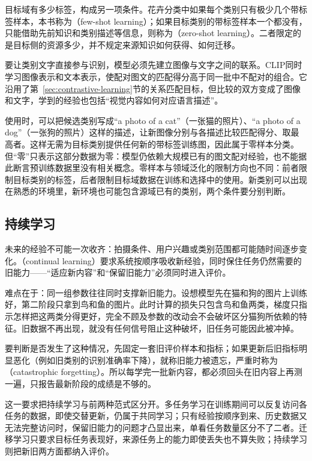 目标域有多少标签，构成另一项条件。花卉分类中如果每个类别只有极少几个带标签样本，本书称为（few-shot learning）；如果目标类别的带标签样本一个都没有，只能借助先前知识和类别描述等信息，则称为（zero-shot learning）。二者限定的是目标侧的资源多少，并不规定来源知识如何获得、如何迁移。

要让类别文字直接参与识别，模型必须先建立图像与文字之间的联系。CLIP同时学习图像表示和文本表示，使配对图文的匹配得分高于同一批中不配对的组合。它沿用了第~\ref{sec:contrastive-learning}节的关系匹配目标，但比较的双方变成了图像和文字，学到的经验也包括“视觉内容如何对应语言描述”。

使用时，可以把候选类别写成“a photo of a cat”（一张猫的照片）、“a photo of a dog”（一张狗的照片）这样的描述，让新图像分别与各描述比较匹配得分、取最高者。这样无需为目标类别提供任何新的带标签训练图，因此属于零样本分类。但“零”只表示这部分数据为零：模型仍依赖大规模已有的图文配对经验，也不能据此断言预训练数据里没有相关概念。零样本与领域泛化的限制方向也不同：前者限制目标类别的标签，后者限制目标域数据在训练和选择中的使用。新类别可以出现在熟悉的环境里，新环境也可能包含源域已有的类别，两个条件要分别判断。

\subsection{持续学习}
\label{sec:continual-learning}

未来的经验不可能一次收齐：拍摄条件、用户兴趣或类别范围都可能随时间逐步变化。（continual learning）要求系统按顺序吸收新经验，同时保住任务仍然需要的旧能力——“适应新内容”和“保留旧能力”必须同时进入评价。

难点在于：同一组参数往往同时支撑新旧能力。设想模型先在猫和狗的图片上训练好，第二阶段只拿到鸟和鱼的图片。此时计算的损失只包含鸟和鱼两类，梯度只指示怎样把这两类分得更好，完全不顾及参数的改动会不会破坏区分猫狗所依赖的特征。旧数据不再出现，就没有任何信号阻止这种破坏，旧任务可能因此被冲掉。

要判断是否发生了这种情况，先固定一套旧评价样本和指标；如果更新后旧指标明显恶化（例如旧类别的识别准确率下降），就称旧能力被遗忘，严重时称为（catastrophic forgetting）。所以每学完一批新内容，都必须回头在旧内容上再测一遍，只报告最新阶段的成绩是不够的。

这一要求把持续学习与前两种范式区分开。多任务学习在训练期间可以反复访问各任务的数据，即使交替更新，仍属于共同学习；只有经验按顺序到来、历史数据又无法完整访问时，保留旧能力的问题才凸显出来，单看任务数量区分不了二者。迁移学习只要求目标任务表现好，来源任务上的能力即使丢失也不算失败；持续学习则把新旧两方面都纳入评价。

